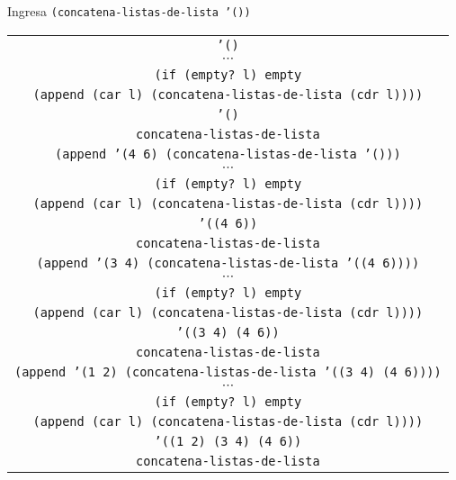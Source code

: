 \documentclass[letterpaper,11pt]{article}
\begin{document}
\begin{enumerate}
\begin{enumerate}
        \newpage
        Ingresa \texttt{(concatena-listas-de-lista '())}
        \begin{center}
            \begin{tabular}{|c|}
                \hline
                \texttt{'()}  \\
                $\cdots$ \\
                \texttt{(if (empty? l) empty} \\
                \texttt{(append (car l) (concatena-listas-de-lista (cdr l))))} \\
                \texttt{'()} \\
                \texttt{concatena-listas-de-lista} \\
                \hline
                \hline
                \texttt{(append '(4 6) (concatena-listas-de-lista '()))} \\
                $\cdots$ \\
                \texttt{(if (empty? l) empty} \\
                \texttt{(append (car l) (concatena-listas-de-lista (cdr l))))} \\
                \texttt{'((4 6))} \\
                \texttt{concatena-listas-de-lista} \\
                \hline
                \hline
                \texttt{(append '(3 4) 
                (concatena-listas-de-lista '((4 6))))}  \\
                $\cdots$ \\
                \texttt{(if (empty? l) empty} \\
                \texttt{(append (car l) (concatena-listas-de-lista (cdr l))))} \\
                \texttt{'((3 4) (4 6))} \\
                \texttt{concatena-listas-de-lista} \\
                \hline
                \hline
                \texttt{(append '(1 2) 
                (concatena-listas-de-lista '((3 4) (4 6))))}  \\
                $\cdots$ \\
                \texttt{(if (empty? l) empty} \\
                \texttt{(append (car l) (concatena-listas-de-lista (cdr l))))} \\
                \texttt{'((1 2) (3 4) (4 6))} \\
                \texttt{concatena-listas-de-lista} \\
                \hline
            \end{tabular}
        \end{center}


\end{enumerate}
\end{enumerate}
\end{document}
